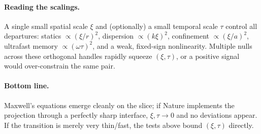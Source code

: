 \paragraph{Reading the scalings.}
A single small spatial scale $\xi$ and (optionally) a small temporal scale $\tau$ control all departures: statics $\propto(\xi/r)^2$, dispersion $\propto(k\xi)^2$, confinement $\propto(\xi/a)^2$, ultrafast memory $\propto(\omega\tau)^2$, and a weak, fixed-sign nonlinearity. Multiple nulls across these orthogonal handles rapidly squeeze $(\xi,\tau)$, or a positive signal would over-constrain the same pair.

\paragraph{Bottom line.}
Maxwell's equations emerge cleanly on the slice; if Nature implements the projection through a perfectly sharp interface, $\xi,\tau\!\to\!0$ and no deviations appear. If the transition is merely very thin/fast, the tests above bound $(\xi,\tau)$ directly.
